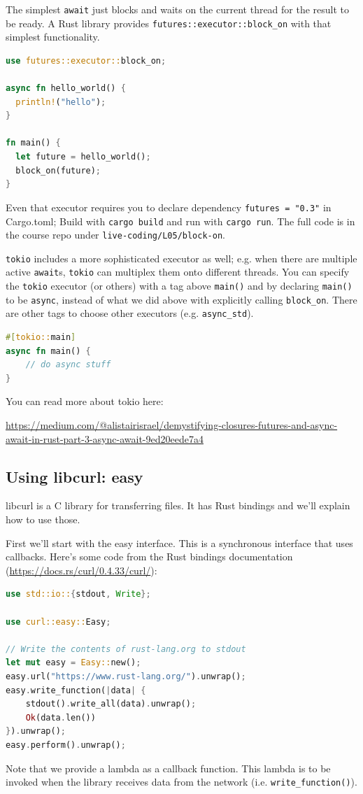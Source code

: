 \documentclass[a4paper]{report}
\begin{document}
The simplest \texttt{await} just blocks and waits on the current
thread for the result to be ready. A Rust library
provides \texttt{futures::executor::block\_on} with that
simplest functionality.

\begin{lstlisting}[language=Rust]
use futures::executor::block_on;

async fn hello_world() {
  println!("hello");
}

fn main() {
  let future = hello_world();
  block_on(future);
}
\end{lstlisting}
Even that executor requires you to declare dependency \texttt{futures = "0.3"}
in Cargo.toml; Build with \texttt{cargo build} and run with \texttt{cargo run}. The full code is in the course repo under \texttt{live-coding/L05/block-on}.

\texttt{tokio} includes a more sophisticated executor as well; e.g. when
there are multiple active \texttt{await}s, \texttt{tokio} can multiplex them onto
different threads. You can specify the \texttt{tokio} executor (or others) with a
tag above {\tt main()} and by declaring \texttt{main()} to be \texttt{async},
instead of what we did above with explicitly calling \texttt{block\_on}.
There are other tags to choose other executors (e.g. \texttt{async\_std}).
\begin{lstlisting}[language=Rust]
#[tokio::main]
async fn main() {
    // do async stuff
}
\end{lstlisting}
You can read more about tokio here:
\begin{center}
\url{https://medium.com/@alistairisrael/demystifying-closures-futures-and-async-await-in-rust-part-3-async-await-9ed20eede7a4}
\end{center}

\subsection*{Using libcurl: easy}
libcurl is a C library for transferring files. It has Rust bindings and we'll
explain how to use those.

First we'll start with the easy interface. This is a synchronous interface
that uses callbacks. Here's some code from the Rust bindings documentation
(\url{https://docs.rs/curl/0.4.33/curl/}):

\begin{lstlisting}[language=Rust]
use std::io::{stdout, Write};

use curl::easy::Easy;

// Write the contents of rust-lang.org to stdout
let mut easy = Easy::new();
easy.url("https://www.rust-lang.org/").unwrap();
easy.write_function(|data| {
    stdout().write_all(data).unwrap();
    Ok(data.len())
}).unwrap();
easy.perform().unwrap();
\end{lstlisting}
Note that we provide a lambda as a callback function. This lambda is to be invoked
when the library receives data from the network (i.e. \texttt{write\_function()}).
\end{document}

